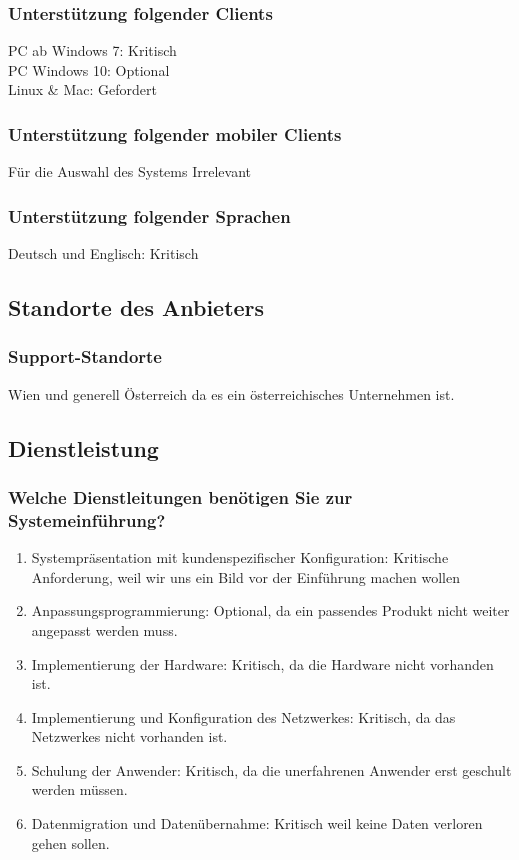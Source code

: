 \subsubsection{Unterstützung folgender Clients}
PC ab Windows 7: Kritisch\\
PC Windows 10: Optional\\
Linux \& Mac: Gefordert
\subsubsection{Unterstützung folgender mobiler Clients}
Für die Auswahl des Systems Irrelevant
\subsubsection{Unterstützung folgender Sprachen}
Deutsch und Englisch: Kritisch

\subsection{Standorte des Anbieters}
\subsubsection{Support-Standorte}
Wien und generell Österreich da es ein österreichisches Unternehmen ist.
\subsection{Dienstleistung}
\subsubsection{Welche Dienstleitungen benötigen Sie zur Systemeinführung?}
\begin{enumerate}
	\item Systempräsentation mit kundenspezifischer Konfiguration: Kritische Anforderung, weil wir uns ein Bild vor der Einführung machen wollen
	\item Anpassungsprogrammierung: Optional, da ein passendes Produkt nicht weiter angepasst werden muss.
	\item Implementierung der Hardware: Kritisch, da die Hardware nicht vorhanden ist.
	\item Implementierung und Konfiguration des Netzwerkes: Kritisch, da das Netzwerkes nicht vorhanden ist.
	\item Schulung der Anwender: Kritisch, da die unerfahrenen Anwender erst geschult werden müssen.
	\item Datenmigration und Datenübernahme: Kritisch weil keine Daten verloren gehen sollen.
\end{enumerate}
